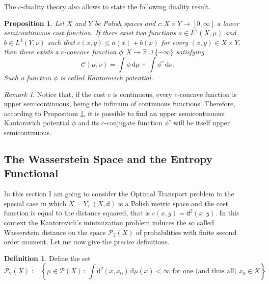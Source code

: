 \documentclass[11pt,twoside,a4paper]{article}
\newcommand{\R}{\mathbb{R}}
\newcommand{\de}{\ensuremath{\, \mathrm d}} %
\newcommand{\suchthat}{\ensuremath{\,:\,}} %
\newcommand{\di}{\mathsf d} %
\newcommand{\Prob}{\mathscr{P}}
\newcommand{\ProbTwo}{\mathscr{P}_2}
\newcommand{\Cost}{\ensuremath{\mathcal C}} %
\theoremstyle{theorem}
\newtheorem{prop}[theorem]{Proposition}
\theoremstyle{definition}
\newtheorem{definition}[theorem]{Definition}
\theoremstyle{remark}
\newtheorem{remark}[theorem]{Remark}
\theoremstyle{proof}
\begin{document}
\noindent The $c$-duality theory also allows to state the following duality result. 

\begin{prop}\label{prop:Kantorovichpotential}
 Let $X$ and $Y$ be Polish spaces and $c:X\times Y \to [0,\infty]$ a lower semicontinuous cost function. If there exist two functions $a\in L^1(X,\mu)$ and $b\in L^1(Y,\nu)$ such that $c(x,y)\leq a(x)+b(x)$ for every $(x,y)\in X\times Y$, then there exists a $c$-concave function $\phi:X \to \R \cup \{-\infty\}$ satisfying 
 \begin{equation*}
     \Cost(\mu,\nu)= \int \phi \de \mu + \int \phi^c \de \nu. 
 \end{equation*}
 Such a function $\phi$ is called Kantorovich potential.
\end{prop}

\begin{remark}\label{remark:Kantorovich}
Notice that, if the cost $c$ is continuous, every $c$-concave function is upper semicontinuous, being the infimum of continuous functions. Therefore, according to Proposition \ref{prop:Kantorovichpotential}, it is possible to find an upper semicontinuous Kantorovich potential $\phi$ and its $c$-conjugate function $\phi^c$ will be itself upper semicontinuous.
\end{remark}



\subsection{The Wasserstein Space and the Entropy Functional}

In this section I am going to consider the Optimal Transport problem in the special case in which $X=Y$, $(X,\di)$ is a Polish metric space and the cost function is equal to the distance squared, that is $c(x,y)=\di^2(x,y)$. In this context the Kantorovich's minimization problem induces the so called Wasserstein distance on the space $\ProbTwo(X)$ of probabilities with finite second order moment. Let me now give the precise definitions.

\begin{definition}
Define the set
\begin{equation*}
    \ProbTwo(X):= \left\{\mu\in \Prob(X) \suchthat \int \di^2(x,x_0) \de\mu(x) <\infty \text{ for one (and thus all) } x_0\in X\right\}
\end{equation*}
\end{definition}
\end{document}
